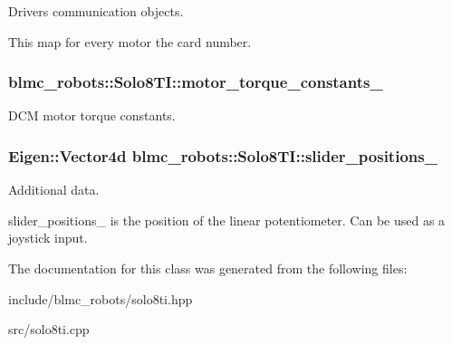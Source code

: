 Drivers communication objects. 

This map for every motor the card number. 
\subsubsection[{\texorpdfstring{motor\+\_\+torque\+\_\+constants\+\_\+}{motor_torque_constants_}}]{ blmc\+\_\+robots\+::\+Solo8\+T\+I\+::motor\+\_\+torque\+\_\+constants\+\_\+\hspace{0.3cm}{\ttfamily [private]}}\hypertarget{classblmc__robots_1_1Solo8TI_ac2b9093468149839f7d6a6be43d108e7}{}\label{classblmc__robots_1_1Solo8TI_ac2b9093468149839f7d6a6be43d108e7}


D\+CM motor torque constants. 

\subsubsection[{\texorpdfstring{slider\+\_\+positions\+\_\+}{slider_positions_}}]{\setlength{\rightskip}{0pt plus 5cm}Eigen\+::\+Vector4d blmc\+\_\+robots\+::\+Solo8\+T\+I\+::slider\+\_\+positions\+\_\+\hspace{0.3cm}{\ttfamily [private]}}\hypertarget{classblmc__robots_1_1Solo8TI_ac81e772bd951a26989c1b9108eccecec}{}\label{classblmc__robots_1_1Solo8TI_ac81e772bd951a26989c1b9108eccecec}


Additional data. 

slider\+\_\+positions\+\_\+ is the position of the linear potentiometer. Can be used as a joystick input. 

The documentation for this class was generated from the following files\+:\begin{DoxyCompactItemize}
\item 
include/blmc\+\_\+robots/solo8ti.\+hpp\item 
src/solo8ti.\+cpp\end{DoxyCompactItemize}
